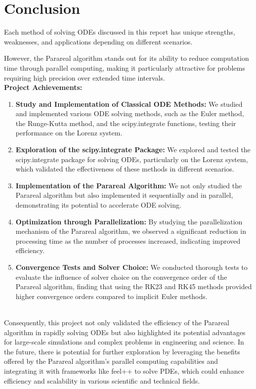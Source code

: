 \documentclass[a4paper,12pt,french]{article}
\begin{document}
\newpage
\section{Conclusion}
Each method of solving ODEs discussed in this report has unique strengths, weaknesses, and applications depending on different scenarios.

However, the Parareal algorithm stands out for its ability to reduce computation time through parallel computing, making it particularly attractive for problems requiring high precision over extended time intervals.\\


\textbf{Project Achievements:}
\begin{enumerate}
    \item \textbf{Study and Implementation of Classical ODE Methods:} We studied and implemented various ODE solving methods, such as the Euler method, the Runge-Kutta method, and the scipy.integrate functions, testing their performance on the Lorenz system.
    \item \textbf{Exploration of the scipy.integrate Package:} We explored and tested the scipy.integrate package for solving ODEs, particularly on the Lorenz system, which validated the effectiveness of these methods in different scenarios.
    \item \textbf{Implementation of the Parareal Algorithm:} We not only studied the Parareal algorithm but also implemented it sequentially and in parallel, demonstrating its potential to accelerate ODE solving.
    \item \textbf{Optimization through Parallelization:} By studying the parallelization mechanism of the Parareal algorithm, we observed a significant reduction in processing time as the number of processes increased, indicating improved efficiency.
    \item \textbf{Convergence Tests and Solver Choice:} We conducted thorough tests to evaluate the influence of solver choice on the convergence order of the Parareal algorithm, finding that using the RK23 and RK45 methods provided higher convergence orders compared to implicit Euler methods.
\end{enumerate}\\

Consequently, this project not only validated the efficiency of the Parareal algorithm in rapidly solving ODEs but also highlighted its potential advantages for large-scale simulations and complex problems in engineering and science. In the future, there is potential for further exploration by leveraging the benefits offered by the Parareal algorithm's parallel computing capabilities and integrating it with frameworks like feel++ to solve PDEs, which could enhance efficiency and scalability in various scientific and technical fields.

\newpage

\vspace*{\fill}

\end{document}
